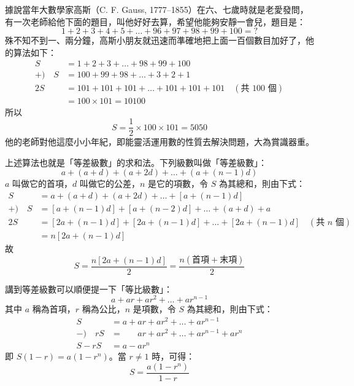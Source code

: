 \begin{example}[等差級數求和]\label{ex:gauss_arith}
據說當年大數學家高斯（C. F. Gauss, 1777--1855）在六、七歲時就是老愛發問，有一次老師給他下面的題目，叫他好好去算，希望他能夠安靜一會兒，題目是：
\begin{equation*}
  1+2+3+4+5+\dots+96+97+98+99+100 = ?
\end{equation*}
殊不知不到一、兩分鐘，高斯小朋友就迅速而準確地把上面一百個數目加好了，他的算法如下：
\begin{align*}
  S &= 1 + 2 + 3 + \dots + 98 + 99 + 100 \\
  +) \quad S &= 100 + 99 + 98 + \dots + 3 + 2 + 1 \\
  \hline
  2S &= 101 + 101 + 101 + \dots + 101 + 101 + 101 \quad (\text{共 } 100 \text{ 個}) \\
  &= 100 \times 101 = 10100
\end{align*}
所以
\begin{equation*}
  S = \frac{1}{2} \times 100 \times 101 = 5050
\end{equation*}
他的老師對他這麼小小年紀，即能靈活運用數的性質去解決問題，大為賞識器重。
\end{example}

上述算法也就是「等差級數」的求和法。下列級數叫做「等差級數」：
\begin{equation}\label{eq:arith_series}
  a + (a+d) + (a+2d) + \dots + (a+(n-1)d)
\end{equation}
$a$ 叫做它的首項，$d$ 叫做它的公差，$n$ 是它的項數，令 $S$ 為其總和，則由下式：
\begin{align*}
  S &= a + (a+d) + (a+2d) + \dots + [a+(n-1)d] \\
  +) \quad S &= [a+(n-1)d] + [a+(n-2)d] + \dots + (a+d) + a \\
  \hline
  2S &= [2a+(n-1)d] + [2a+(n-1)d] + \dots + [2a+(n-1)d] \quad (\text{共 } n \text{ 個}) \\
  &= n[2a+(n-1)d]
\end{align*}
故
\begin{equation}\label{eq:arith_sum_formula}
  S = \frac{n[2a+(n-1)d]}{2} = \frac{n(\text{首項} + \text{末項})}{2}
\end{equation}

講到等差級數可以順便提一下「等比級數」：
\begin{equation}\label{eq:geom_series}
  a + ar + ar^2 + \dots + ar^{n-1}
\end{equation}
其中 $a$ 稱為首項，$r$ 稱為公比，$n$ 是項數，令 $S$ 為其總和，則由下式：
\begin{align*}
  S &= a + ar + ar^2 + \dots + ar^{n-1} \\
  -) \quad rS &= \phantom{a +} ar + ar^2 + \dots + ar^{n-1} + ar^n \\
  \hline
  S - rS &= a - ar^n
\end{align*}
即 $S(1-r) = a(1-r^n)$。當 $r \neq 1$ 時，可得：
\begin{equation}\label{eq:geom_sum_formula}
  S = \frac{a(1-r^n)}{1-r}
\end{equation}

